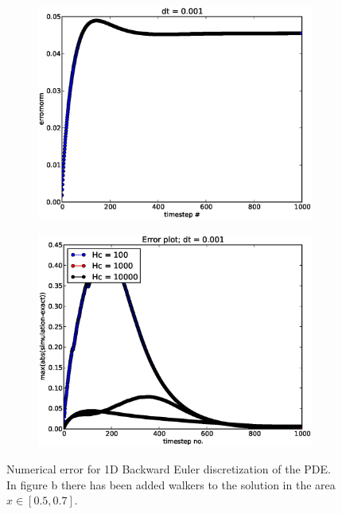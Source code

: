 \begin{figure}[H]
\centering
\begin{subfigure}[b]{0.48\textwidth}
\includegraphics[width=\textwidth]{../doc/results/experiment_19112013_1514/results/deterministic_errorplot.eps}
\caption{}
\label{errorplot_BE1D_noWalk}
\end{subfigure}
\begin{subfigure}[b]{0.48\textwidth}
 \includegraphics[width=\textwidth]{../doc/results/experiment_19112013_1514/results/errorplot.eps}
 \caption{}
 \label{errorplot_BE1D_Walk}
\end{subfigure}
\caption[Numerical error for 1D Backward Euler discretization]{Numerical error for 1D Backward Euler discretization of the PDE. In figure b there has been added walkers to the solution in the area $x\in[0.5,0.7]$.}
\label{errorplot_BE1D_first}
\end{figure}

